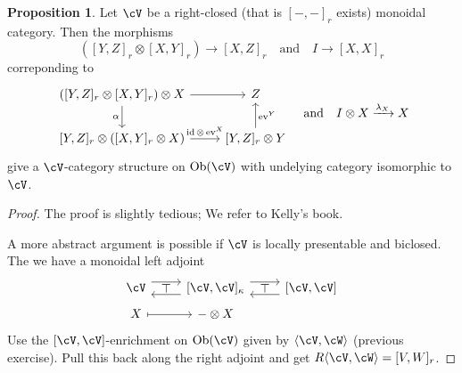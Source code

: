 \documentclass[a4paper,11pt,oneside,openany]{scrbook}
\DeclareMathOperator{\id}{id}
\DeclareMathOperator{\Ob}{Ob}
\DeclareMathOperator{\ev}{ev}
\theoremstyle{definition}
\theoremstyle{definition}
\newtheorem{prop}[thm]{Proposition}
\begin{document}
\begin{prop}
    Let $ \cV $ be a right-closed (that is $ [-,-]_r $ exists) monoidal category.
    Then the morphisms
    \begin{displaymath}
	([Y,Z]_r \otimes [X,Y]_r ) \to [X,Z]_r \quad \text{and} \quad I \to [X,X]_r
    \end{displaymath}
    correponding to
    \begin{displaymath}
	\begin{tikzcd}
	([Y,Z]_r \otimes [X,Y]_r) \otimes X \arrow[r]\arrow[d, "\alpha"'] & Z \\
	\lbrack Y,Z\rbrack_r \otimes ([X,Y]_r \otimes X) \arrow[r, "\id\otimes \ev^X"]  & \lbrack Y,Z\rbrack_r\otimes Y \arrow[u, "\ev^Y"']
    \end{tikzcd}\quad \text{and}\quad
    I\otimes X \xrightarrow{\lambda_X} X
    \end{displaymath}
    give a $ \cV $-category structure on $ \Ob(\cV) $ with undelying category isomorphic to $ \cV $.
\end{prop}
\begin{proof}
    The proof is slightly tedious; We refer to Kelly's book.

    A more abstract argument is possible if $ \cV $ is locally presentable and biclosed.
    The we have a monoidal left adjoint
    \begin{displaymath}
	\begin{tikzcd}[row sep = tiny]
	    \cV
	    \arrow[r, shift left=.5em] \arrow[from=r, shift left=.5em] \arrow[r,phantom, "\top"]
	    & \lbrack \cV,\cV\rbrack_{\kappa}
	    \arrow[r, shift left=.5em]
	    \arrow[from=r, shift left=.5em]
	    \arrow[r,phantom, "\top"]
	    & \lbrack \cV ,\cV \rbrack\\
	    X \arrow[mapsto, r] & -\otimes X
        \end{tikzcd}
    \end{displaymath}
    Use the $ [\cV,\cV] $-enrichment on $ \Ob(\cV) $ given by $ \langle\cV,\cW\rangle $ (previous exercise).
    Pull this back along the right adjoint and get $ R\langle \cV,\cW\rangle = [V,W]_r $.
\end{proof}
\end{document}

